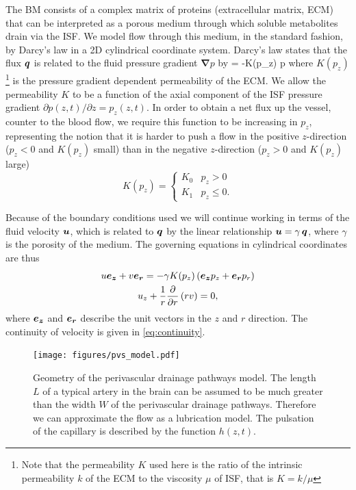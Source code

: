 \documentclass[a4paper,titlepage]{scrartcl}
\begin{document}
The BM consists of a complex matrix of proteins (extracellular matrix, ECM) that can be interpreted as a porous medium through which soluble metabolites drain via the ISF. We model flow through this medium, in the standard fashion, by Darcy's law in a 2D cylindrical coordinate system. Darcy's law states that the flux $\boldsymbol{q}$ is related to the fluid pressure gradient $\boldsymbol{\nabla} p$ by
\beq\label{eq:darcy}
  \q = -K(p_z) \boldsymbol{\nabla} p
\eeq
where $K(p_z)$\footnote{Note that the permeability $K$ used here is the ratio of the intrinsic permeability $k$ of the ECM to the viscosity $\mu$ of ISF, that is $K = k / \mu$} is the pressure gradient dependent permeability of the ECM. We allow the permeability $K$ to be a function of the axial component of the ISF pressure gradient $\partial p(z,t) / \partial z = p_z(z,t)$. In order to obtain a net flux up the vessel, counter to the blood flow, we require this function to be increasing in $p_z$, representing the notion that it is harder to push a flow in the positive $z$-direction ($p_z<0$ and $K(p_z)$ small) than in the negative $z$-direction ($p_z>0$ and $K(p_z)$ large)
\begin{equation}
  K(p_z) = \begin{cases}
    K_0 & p_z > 0\\
    K_1 & p_z \leq 0.
  \end{cases}
\end{equation}

Because of the boundary conditions used we will continue working in terms of the fluid velocity $\boldsymbol{u}$, which is related to $\boldsymbol{q}$ by the linear relationship $\boldsymbol{u} = \gamma \, \boldsymbol{q}$, where $\gamma$ is the porosity of the medium. The governing equations in cylindrical coordinates are thus
\begin{gather}
  u \boldsymbol{e_z} + v \boldsymbol{e_r} = - \gamma K(p_z) \left( \boldsymbol{e_z} p_z + \boldsymbol{e_r} p_r \right) \label{eq:darcy_velocity}\\
  u_z + \frac{1}{r} \frac{\partial}{\partial r} \left( r v \right) = 0 \label{eq:continuity},
\end{gather}
where $\boldsymbol{e_z}$ and $\boldsymbol{e_r}$ describe the unit vectors in the $z$ and $r$ direction. The continuity of velocity is given in \eqref{eq:continuity}.

\begin{figure}
\centerline{\texttt{[image: figures/pvs\_model.pdf]}}
\caption{Geometry of the perivascular drainage pathways model. The length $L$ of a typical artery in the brain can be assumed to be much greater than the width $W$ of the perivascular drainage pathways. Therefore we can approximate the flow as a lubrication model. The pulsation of the capillary is described by the function $h(z,t)$.\label{fig:pvs_model}}
\end{figure}
\end{document}
